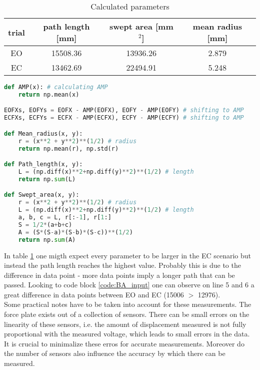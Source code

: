 \documentclass[english, a4paper, 11pt]{article}
\begin{document}
    \begin{table}[!h]
        \centering
        \begin{tabular}{c|c|c|c}
            trial & path length [mm] & swept area [mm$^2$] & mean radius [mm]\\ \hline
            EO & 15508.36 & 13936.26 & 2.879\\
            EC & 13462.69 & 22494.91 & 5.248
        \end{tabular}
        \caption{Calculated parameters}
        \label{tab:params}
    \end{table}

    \begin{lstlisting}[language=Python, caption=calculating the parameters]
def AMP(x): # calculating AMP
    return np.mean(x)

EOFXs, EOFYs = EOFX - AMP(EOFX), EOFY - AMP(EOFY) # shifting to AMP
ECFXs, ECFYs = ECFX - AMP(ECFX), ECFY - AMP(ECFY) # shifting to AMP

def Mean_radius(x, y):
    r = (x**2 + y**2)**(1/2) # radius
    return np.mean(r), np.std(r)

def Path_length(x, y):
    L = (np.diff(x)**2+np.diff(y)**2)**(1/2) # length
    return np.sum(L)

def Swept_area(x, y):
    r = (x**2 + y**2)**(1/2) # radius
    L = (np.diff(x)**2+np.diff(y)**2)**(1/2) # length
    a, b, c = L, r[:-1], r[1:]
    S = 1/2*(a+b+c)
    A = (S*(S-a)*(S-b)*(S-c))**(1/2)
    return np.sum(A)
    \end{lstlisting}

In table \ref*{tab:params} one migth expect every parameter to be larger in the EC scenario but instead the path length
reaches the highest value. Probably this is due to the difference in data point - more data points imply a longer path that can be passed.
Looking to code block \ref*{code:BA_input} one can observe on line 5 and 6 a great difference in data points between EO and EC (15006 $>$ 12976).\\

Some practical notes have to be taken into account for these measurements. The force plate
exists out of a collection of sensors. There can be small errors on the linearity of these 
sensors, i.e. the amount of displacement measured is not fully proportional with the measured voltage, which
leads to small errors in the data. It is crucial to minimalize these erros for accurate measurements.
Moreover do the number of sensors also influence the accuracy by which there can be measured.
\end{document}

